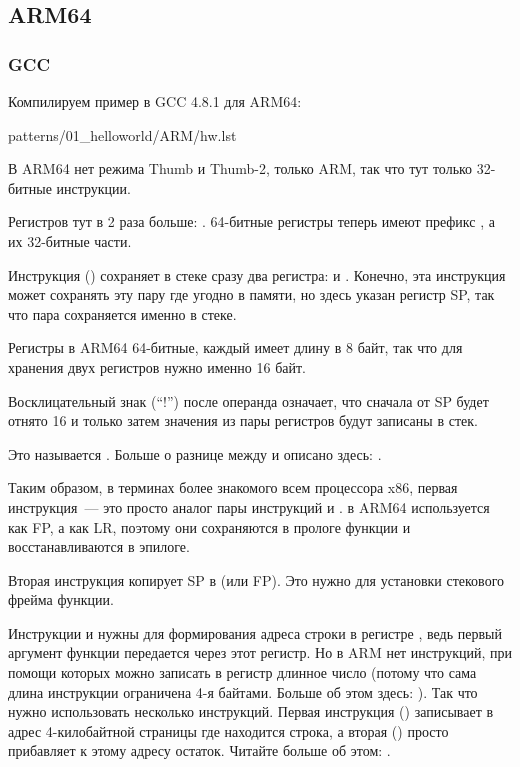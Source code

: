 \subsection{ARM64}

\subsubsection{GCC}

Компилируем пример в GCC 4.8.1 для ARM64:


{patterns/01_helloworld/ARM/hw.lst}

В ARM64 нет режима Thumb и Thumb-2, только ARM, так что тут только 32-битные инструкции.

Регистров тут в 2 раза больше: .
64-битные регистры теперь имеют префикс 
, а их 32-битные части\EMDASH{}.

Инструкция  () 
сохраняет в стеке сразу два регистра:  и .
Конечно, эта инструкция может сохранять эту пару где угодно в памяти, но здесь указан регистр \ac{SP}, так что
пара сохраняется именно в стеке.

Регистры в ARM64 64-битные, каждый имеет длину в 8 байт, так что для хранения двух регистров нужно именно 16 байт.

Восклицательный знак (``!'') после операнда означает, что сначала от \ac{SP} будет отнято 16 и только затем
значения из пары регистров будут записаны в стек.

Это называется .
Больше о разнице между  и  
описано здесь: .

Таким образом, в терминах более знакомого всем процессора x86, первая инструкция~--- это просто аналог 
пары инструкций  и .
 в ARM64 используется как \ac{FP}, а  
как \ac{LR}, поэтому они сохраняются в прологе функции и
восстанавливаются в эпилоге.

Вторая инструкция копирует \ac{SP} в  (или \ac{FP}).
Это нужно для установки стекового фрейма функции.

\label{pointers_ADRP_and_ADD}
Инструкции  и \ADD нужны для формирования адреса строки  в регистре , 
ведь первый аргумент функции передается через этот регистр.
Но в ARM нет инструкций, при помощи которых можно записать в регистр длинное число 
(потому что сама длина инструкции ограничена 4-я байтами. Больше об этом здесь: ).
Так что нужно использовать несколько инструкций.
Первая инструкция () записывает в  адрес 4-килобайтной страницы где находится строка, 
а вторая (\ADD) просто прибавляет к этому адресу остаток.
Читайте больше об этом: .

